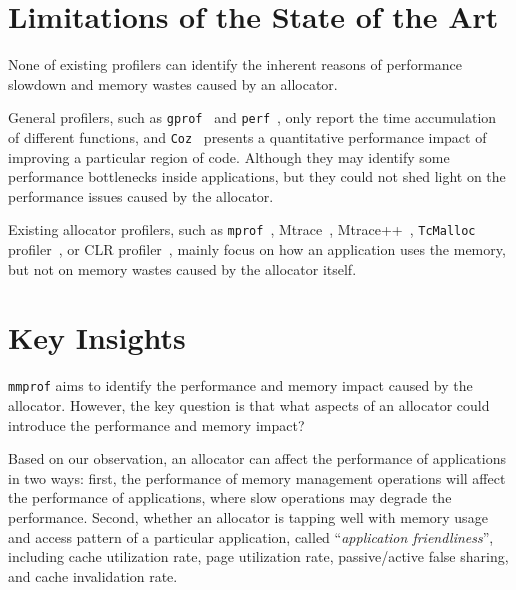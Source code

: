 \documentclass[pageno]{jpaper}
\newcommand{\MP}{\texttt{mmprof}}
\begin{document}
\section{Limitations of the State of the Art}
\label{sec:limitations}

None of existing profilers can identify the inherent reasons of performance slowdown and memory wastes caused by an allocator. 

General profilers, such as \texttt{gprof}~\cite{DBLP:conf/sigplan/GrahamKM82} and \texttt{perf}~\cite{perf}, only report the time accumulation of different functions, and \texttt{Coz}~\cite{Coz} presents a quantitative performance impact of improving a particular region of code. Although they may identify some performance bottlenecks inside applications, but they could not shed light on the performance issues caused by the allocator. 

 Existing allocator profilers, such as \texttt{mprof}~\cite{Zorn:1988:MAP:894814}, Mtrace~\cite{mtrace}, Mtrace++~\cite{Lee:2000:DMM:786772.787150}, \texttt{TcMalloc} profiler~\cite{tcmalloc-profiler}, or CLR profiler~\cite{lupasc2014dynamic}, mainly focus on how an application uses the memory, but not on memory wastes caused by the allocator itself. 


\section{Key Insights}
\label{sec:key-insights}


\MP{} aims to identify the performance and memory impact caused by the allocator. However, the key question is that what aspects of an allocator could introduce the performance and memory impact? 

Based on our observation, an allocator can affect the performance of applications in two ways: first, the performance of memory management operations will affect the performance of applications, where slow operations may degrade the performance.  Second, whether an allocator is tapping well with memory usage and access pattern of a particular application, called ``\textit{application friendliness}'', including cache utilization rate, page utilization rate, passive/active false sharing, and cache invalidation rate. 
\end{document}
